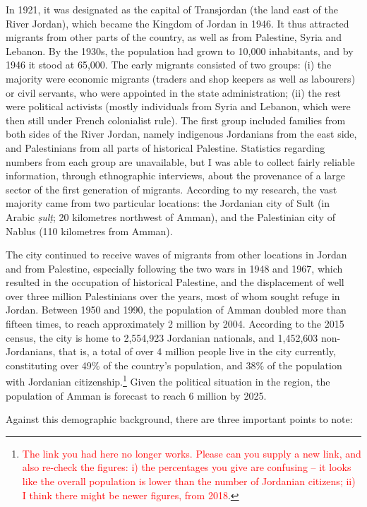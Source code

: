 \documentclass[output=paper]{langsci/langscibook}
\begin{document}
In 1921, it was designated as the capital of Transjordan (the land east of the River Jordan), which became the Kingdom of Jordan in 1946. It thus attracted migrants from other parts of the country, as well as from Palestine, Syria and Lebanon. By the 1930s, the population had grown to 10,000 inhabitants, and by 1946 it stood at 65,000. The early migrants consisted of two groups: (i) the majority were economic migrants (traders and shop keepers as well as labourers) or civil servants, who were appointed in the state administration; (ii) the rest were political activists (mostly individuals from Syria and Lebanon, which were then still under French colonialist rule). The first group included families from both sides of the River Jordan, namely indigenous Jordanians from the east side, and Palestinians from all parts of historical Palestine. Statistics regarding numbers from each group are unavailable, but I was able to collect fairly reliable information, through ethnographic interviews, about the provenance of a large sector of the first generation of migrants. According to my research, the vast majority came from two particular locations: the Jordanian city of Sult (in Arabic \textit{ṣulṭ}; 20 kilometres northwest of Amman), and the Palestinian city of Nablus (110 kilometres from Amman).

The city continued to receive waves of migrants from other locations in Jordan and from Palestine, especially following the two wars in 1948 and 1967, which resulted in the occupation of historical Palestine, and the displacement of well over three million Palestinians over the years, most of whom sought refuge in Jordan. Between 1950 and 1990, the population of Amman doubled more than fifteen times, to reach approximately 2 million by 2004. According to the 2015 census, the city is home to 2,554,923 Jordanian nationals, and 1,452,603 non-Jordanians, that is, a total of over 4 million people live in the city currently, constituting over 49\% of the country’s population, and 38\% of the population with Jordanian citizenship.\footnote{\textcolor{red}{The link you had here no longer works. Please can you supply a new link, and also re-check the figures: i) the percentages you give are confusing -- it looks like the overall population is lower than the number of Jordanian citizens; ii) I think there might be newer figures, from 2018}.} Given the political situation in the region, the population of Amman is forecast to reach 6 million by 2025. 

Against this demographic background, there are three important points to note:
\end{document}
